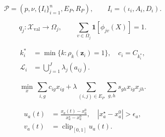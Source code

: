 \begin{equation}
\mathcal{P}=(p,\nu,\{I_i\}_{i=1}^{n},E_P,R_P),\qquad I_i=(\iota_i,A_i,D_i).
\tag{1}
\end{equation}

\begin{equation}
q_j:\mathcal{X}_{\mathrm{val}}\to\Omega_j,\qquad \sum_{v\in\Omega_j}\mathbf{1}[\phi_{jv}(X)]=1.
\tag{2}
\end{equation}

\begin{equation}
\begin{aligned}k_i^*&=\min\{k:\rho_k(\mathbf z_i)=1\},\quad c_i=C_{k_i^*},\\\mathcal L_i&=\bigcup_{j=1}^{J}\lambda_j(a_{ij}).\end{aligned}
\tag{3}
\end{equation}

\begin{equation}
\min_{x}\ \sum_{i,g}c_{ig}x_{ig}+\lambda\!\sum_{(i,j)\in E_P}\sum_{g,h}s_{gh}x_{ig}x_{jh}.
\tag{4}
\end{equation}

\begin{equation}
\begin{aligned}u_a(t)&=\frac{x_a(t)-x_a^0}{x_a^\star-x_a^0},\quad |x_a^\star-x_a^0|>\epsilon_a,\\v_a(t)&=\operatorname{clip}_{[0,1]}u_a(t).\end{aligned}
\tag{5}
\end{equation}